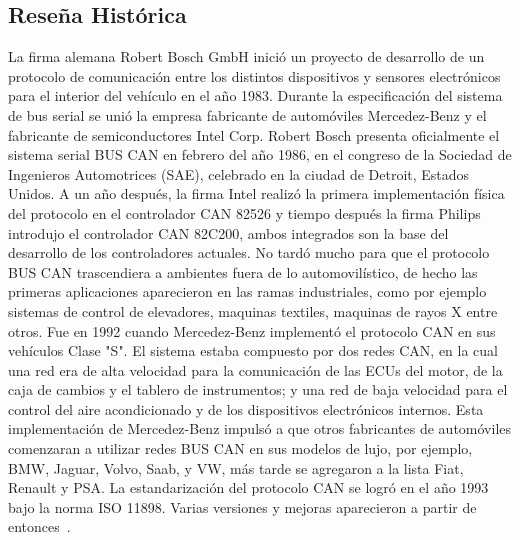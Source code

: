 \subsection {Reseña Histórica}
La firma alemana Robert Bosch GmbH inició un proyecto de desarrollo de un protocolo de comunicación entre los distintos dispositivos y sensores  electrónicos para el interior del vehículo en el año 1983. 
Durante la especificación del sistema de bus serial se unió la empresa fabricante de automóviles Mercedez-Benz y el fabricante de semiconductores Intel Corp. 
Robert Bosch presenta oficialmente el sistema serial BUS CAN en febrero del año 1986, en el congreso de la Sociedad de Ingenieros Automotrices (SAE), celebrado en la ciudad de Detroit, Estados Unidos.
A un año después, la firma Intel realizó la primera implementación física del protocolo en el controlador CAN 82526 y tiempo después la firma Philips introdujo el controlador CAN 82C200, ambos integrados son la base del desarrollo de los controladores actuales.
No tardó mucho para que el protocolo BUS CAN trascendiera a ambientes fuera de lo automovilístico, de hecho las primeras aplicaciones aparecieron en las ramas industriales, como por ejemplo sistemas de control de elevadores, maquinas textiles, maquinas de rayos X entre otros.
Fue en 1992 cuando Mercedez-Benz implementó el protocolo CAN en sus vehículos Clase "S". El sistema estaba compuesto por dos redes CAN, en la cual una red era de alta velocidad para la comunicación de las ECUs del motor, de la caja de cambios y el tablero de instrumentos; y una red de baja velocidad para el control del aire acondicionado y de los dispositivos electrónicos internos.  
Esta implementación de Mercedez-Benz impulsó a que otros fabricantes de automóviles comenzaran a utilizar redes BUS CAN en sus modelos de lujo, por ejemplo, BMW, Jaguar, Volvo, Saab, y VW, más tarde se agregaron a la lista Fiat, Renault y PSA. 
La estandarización del protocolo CAN se logró en el año 1993 bajo la norma ISO 11898. 
Varias versiones y mejoras aparecieron a partir de entonces~\cite{DSEEPC}.

